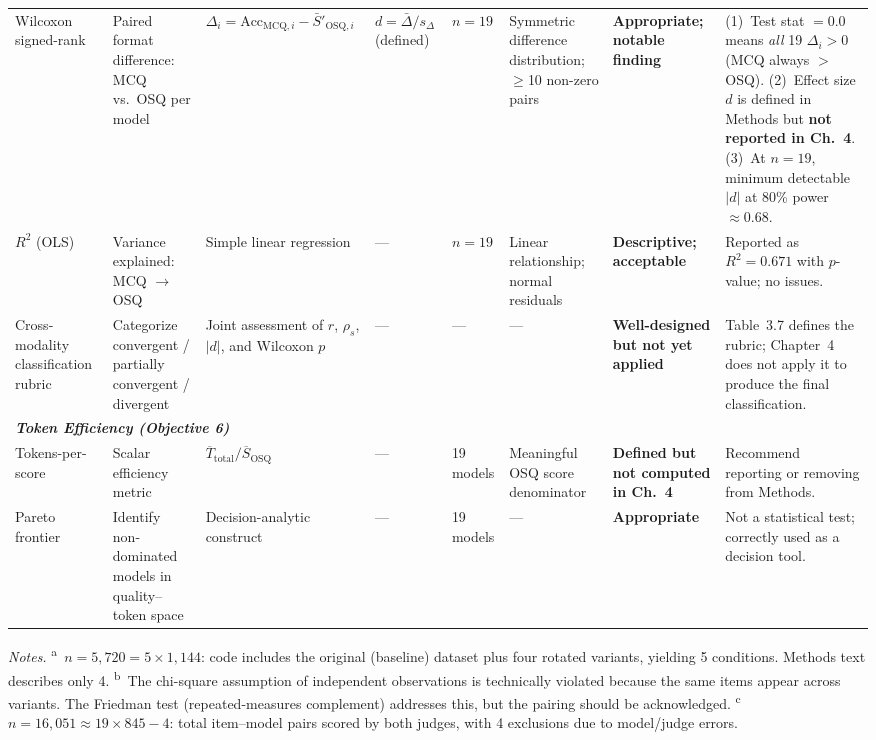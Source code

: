 \begin{table}[htbp]
{\begin{tabular}{p{2.0cm} p{2.2cm} p{2.2cm} p{1.5cm} p{1.5cm} p{2.0cm} p{3.0cm} p{3.0cm}}
Wilcoxon signed-rank &
Paired format difference: MCQ vs.\ OSQ per model &
$\Delta_i = \text{Acc}_{\text{MCQ},i} - \bar{S}'_{\text{OSQ},i}$ &
$d = \bar{\Delta}/s_{\Delta}$ (defined) &
$n{=}19$ &
Symmetric difference distribution; $\geq$10 non-zero pairs &
\textbf{Appropriate; notable finding} &
(1)~Test stat $= 0.0$ means \textit{all} 19 $\Delta_i > 0$ (MCQ always $>$ OSQ). (2)~Effect size $d$ is defined in Methods but \textbf{not reported in Ch.~4}. (3)~At $n{=}19$, minimum detectable $|d|$ at 80\% power $\approx 0.68$. \\
\addlinespace

$R^2$ (OLS) &
Variance explained: MCQ $\rightarrow$ OSQ &
Simple linear regression &
--- &
$n{=}19$ &
Linear relationship; normal residuals &
\textbf{Descriptive; acceptable} &
Reported as $R^2{=}0.671$ with $p$-value; no issues. \\
\addlinespace

Cross-modality classification rubric &
Categorize convergent / partially convergent / divergent &
Joint assessment of $r$, $\rho_s$, $|d|$, and Wilcoxon $p$ &
--- &
--- &
--- &
\textbf{Well-designed but not yet applied} &
Table~3.7 defines the rubric; Chapter~4 does not apply it to produce the final classification. \\

\midrule

\multicolumn{8}{l}{\textit{\textbf{Token Efficiency (Objective 6)}}} \\
\addlinespace[0.3em]

Tokens-per-score &
Scalar efficiency metric &
$\overline{T}_{\text{total}} / \overline{S}_{\text{OSQ}}$ &
--- &
19 models &
Meaningful OSQ score denominator &
\textbf{Defined but not computed in Ch.~4} &
Recommend reporting or removing from Methods. \\
\addlinespace

Pareto frontier &
Identify non-dominated models in quality--token space &
Decision-analytic construct &
--- &
19 models &
--- &
\textbf{Appropriate} &
Not a statistical test; correctly used as a decision tool. \\

\bottomrule
\end{tabular}
}

\vspace{0.5em}
\footnotesize
\textit{Notes.}
\textsuperscript{a}~$n{=}5{,}720{=}5 \times 1{,}144$: code includes the original (baseline) dataset plus four rotated variants, yielding 5 conditions. Methods text describes only 4.
\textsuperscript{b}~The chi-square assumption of independent observations is technically violated because the same items appear across variants. The Friedman test (repeated-measures complement) addresses this, but the pairing should be acknowledged.
\textsuperscript{c}~$n{=}16{,}051 \approx 19 \times 845 - 4$: total item--model pairs scored by both judges, with 4 exclusions due to model/judge errors.
\end{table}


